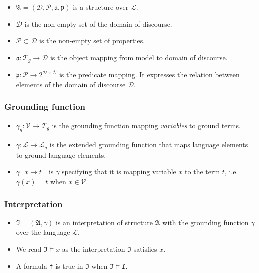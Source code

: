 \documentclass[runningheads]{llncs}
\begin{document}
\begin{itemize}
  \item $\mathfrak{A} = (\mathcal{D}, \mathcal{P}, \mathfrak{a}, \mathfrak{p})$ is a structure over $\mathcal{L}$.
  \item $\mathcal{D}$ is the non-empty set of the domain of discourse.
  \item $\mathcal{P} \subset \mathcal{D}$ is the non-empty set of properties.
  \item $\mathfrak{a}: \mathcal{T}_g \rightarrow \mathcal{D}$ is the object mapping from model to domain of discourse.
  \item $\mathfrak{p}: \mathcal{P} \rightarrow 2^{\mathcal{D} \times \mathcal{D}}$ is the predicate mapping. It expresses the relation between elements of the domain of discourse $\mathcal{D}$.
\end{itemize}


\subsubsection{Grounding function}

\begin{itemize}
  \item $\gamma_g: \mathcal{V} \rightarrow \mathcal{T}_g$ is the grounding function mapping \emph{variables} to ground terms.
  \item $\gamma: \mathcal{L} \rightarrow \mathcal{L}_g$ is the extended grounding function that maps language elements to ground language elements.
  \item $\gamma\left[x \mapsto t\right]$ is $\gamma$ specifying that it is mapping variable $x$ to the term $t$, i.e. $\gamma(x) = t$ when $x \in \mathcal{V}$.
\end{itemize}


\subsubsection{Interpretation}

\begin{itemize}
  \item $\mathfrak{I} = (\mathfrak{A}, \gamma)$ is an interpretation of structure $\mathfrak{A}$ with the grounding function $\gamma$ over the language $\mathcal{L}$.
  \item We read $\mathfrak{I} \vDash x$ as the interpretation $\mathfrak{I}$ satisfies $x$.
  \item A formula \texttt{f} is true in $\mathfrak{I}$ when $\mathfrak{I} \vDash \texttt{f}$.
\end{itemize}
\end{document}
